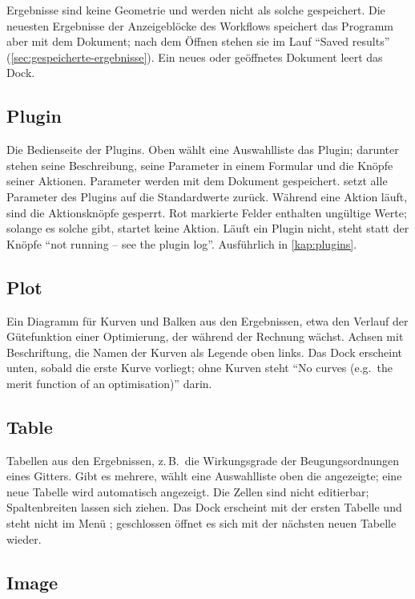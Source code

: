 Ergebnisse sind keine Geometrie und werden nicht als solche gespeichert. Die neuesten
Ergebnisse der Anzeigeblöcke des Workflows speichert das Programm aber mit dem Dokument; nach
dem Öffnen stehen sie im Lauf \enquote{Saved results} (\autoref{sec:gespeicherte-ergebnisse}).
Ein neues oder geöffnetes Dokument leert das Dock.

\subsection{Plugin}\label{sec:dock-plugin}

Die Bedienseite der Plugins. Oben wählt eine Auswahlliste das Plugin; darunter stehen seine
Beschreibung, seine Parameter in einem Formular und die Knöpfe seiner Aktionen. Parameter
werden mit dem Dokument gespeichert.  setzt alle Parameter des Plugins
auf die Standardwerte zurück. Während eine Aktion läuft, sind die Aktionsknöpfe gesperrt.
Rot markierte Felder enthalten ungültige Werte; solange es solche gibt, startet keine Aktion.
Läuft ein Plugin nicht, steht statt der Knöpfe \enquote{not running -- see the plugin log}.
Ausführlich in \autoref{kap:plugins}.

\subsection{Plot}\label{sec:dock-plot}

Ein Diagramm für Kurven und Balken aus den Ergebnissen, etwa den Verlauf der Gütefunktion
einer Optimierung, der während der Rechnung wächst. Achsen mit Beschriftung, die Namen der
Kurven als Legende oben links. Das Dock erscheint unten, sobald die erste Kurve vorliegt;
ohne Kurven steht \enquote{No curves (e.g.\ the merit function of an optimisation)} darin.

\subsection{Table}

Tabellen aus den Ergebnissen, z.\,B.\ die Wirkungsgrade der Beugungsordnungen eines Gitters.
Gibt es mehrere, wählt eine Auswahlliste oben die angezeigte; eine neue Tabelle wird
automatisch angezeigt. Die Zellen sind nicht editierbar; Spaltenbreiten lassen sich ziehen.
Das Dock erscheint mit der ersten Tabelle und steht nicht im Menü ; geschlossen
öffnet es sich mit der nächsten neuen Tabelle wieder.

\subsection{Image}\label{sec:dock-image}

